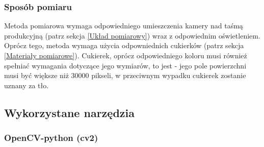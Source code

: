 \documentclass{article}
\begin{document}
\subsubsection{Sposób pomiaru}
\label{Sposób pomiaru}

Metoda pomiarowa wymaga odpowiedniego umieszczenia kamery nad taśmą produkcyjną (patrz sekcja \ref{Układ pomiarowy}) wraz z odpowiednim oświetleniem. Oprócz tego, metoda wymaga użycia odpowniednich cukierków (patrz sekcja \ref{Materiały pomiarowe}). Cukierek, oprócz odpowiedniego koloru musi również spełniać wymagania dotyczące jego wymiarów, to jest - jego pole powierzchni musi być większe niż 30000 pikseli, w przeciwnym wypadku cukierek zostanie uznany za tło.

\subsection{Wykorzystane narzędzia}
\label{Wykorzystane narzędzia}

\subsubsection{OpenCV-python (cv2)}
\label{OpenCV-python (cv2)}
\end{document}
